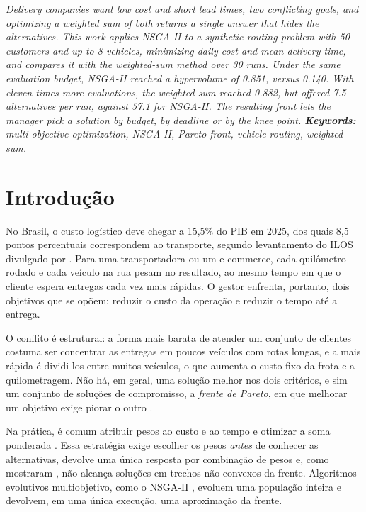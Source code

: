 \documentclass[a4paper,12pt]{article}
\renewenvironment{abstract}{%
  \list{}{\advance\topsep by6pt\relax
    \leftmargin=0.8cm
    \labelwidth=0pt
    \listparindent=0pt
    \itemindent\listparindent
    \rightmargin\leftmargin}\item[\hskip\labelsep\bfseries\itshape Abstract.]\itshape}%
  {\endlist}
\begin{document}
\begin{abstract}
Delivery companies want low cost and short lead times, two conflicting goals, and optimizing a weighted sum of both returns a single answer that hides the alternatives. This work applies NSGA-II to a synthetic routing problem with 50 customers and up to 8 vehicles, minimizing daily cost and mean delivery time, and compares it with the weighted-sum method over 30 runs. Under the same evaluation budget, NSGA-II reached a hypervolume of 0.851, versus 0.140. With eleven times more evaluations, the weighted sum reached 0.882, but offered 7.5 alternatives per run, against 57.1 for NSGA-II. The resulting front lets the manager pick a solution by budget, by deadline or by the knee point.
\end{abstract}
\noindent\textbf{Keywords:} multi-objective optimization, NSGA-II, Pareto front, vehicle routing, weighted sum.

\vspace{18pt}

\section{Introdução}\label{sec:intro}
\noindent No Brasil, o custo logístico deve chegar a 15,5\% do PIB em 2025, dos quais 8,5 pontos percentuais correspondem ao transporte, segundo levantamento do ILOS divulgado por \citep{mundolog2025}. Para uma transportadora ou um e-commerce, cada quilômetro rodado e cada veículo na rua pesam no resultado, ao mesmo tempo em que o cliente espera entregas cada vez mais rápidas. O gestor enfrenta, portanto, dois objetivos que se opõem: reduzir o custo da operação e reduzir o tempo até a entrega.

O conflito é estrutural: a forma mais barata de atender um conjunto de clientes costuma ser concentrar as entregas em poucos veículos com rotas longas, e a mais rápida é dividi-los entre muitos veículos, o que aumenta o custo fixo da frota e a quilometragem. Não há, em geral, uma solução melhor nos dois critérios, e sim um conjunto de soluções de compromisso, a \emph{frente de Pareto}, em que melhorar um objetivo exige piorar o outro \citep{miettinen1999,deb2001}.

Na prática, é comum atribuir pesos ao custo e ao tempo e otimizar a soma ponderada \citep{marler2004}. Essa estratégia exige escolher os pesos \emph{antes} de conhecer as alternativas, devolve uma única resposta por combinação de pesos e, como mostraram \citet{das1997}, não alcança soluções em trechos não convexos da frente. Algoritmos evolutivos multiobjetivo, como o NSGA-II \citep{deb2002}, evoluem uma população inteira e devolvem, em uma única execução, uma aproximação da frente.
\end{document}
